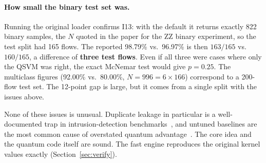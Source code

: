 \paragraph{How small the binary test set was.} Running the original loader confirms I13: with the
default  it returns exactly 822 binary samples, the $N$ quoted in the paper for
the ZZ binary experiment, so the test split had 165 flows. The reported 98.79\% vs.\ 96.97\% is then
$163/165$ vs.\ $160/165$, a difference of \textbf{three test flows}. Even if all three were cases
where only the QSVM was right, the exact McNemar test would give $p=0.25$. The multiclass figures
(92.00\% vs.\ 80.00\%, $N=996=6\times166$) correspond to a 200-flow test set. The 12-point gap is
large, but it comes from a single split with the issues above.

None of these issues is unusual. Duplicate leakage in particular is a well-documented trap in
intrusion-detection benchmarks~\cite{engelen2021,kaufman2012}, and untuned baselines are the most
common cause of overstated quantum advantage~\cite{bowles2024}. The core idea and the quantum
code itself are sound. The fast engine reproduces the original kernel values exactly
(Section~\ref{sec:verify}).
